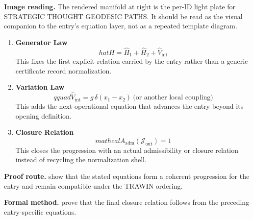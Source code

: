 \begin{samepage}
\noindent\begin{minipage}[t]{0.45\linewidth}
\vspace{0pt}
\raggedright
\scriptsize\textbf{Image reading.} The rendered manifold at right is the per-ID light plate for STRATEGIC THOUGHT GEODESIC PATHS. It should be read as the visual companion to the entry's equation layer, not as a repeated template diagram.\par
\end{minipage}\hfill
\begin{minipage}[t]{0.53\linewidth}
\vspace*{-0.10in}
\raggedright
{}
\end{minipage}
\end{samepage}

\clearpage


\begin{enumerate}[leftmargin=1.6em,itemsep=9pt,topsep=6pt]
\item \textbf{Generator Law}
\[
hat H=\hat H_1+\hat H_2+ \hat V_{\text{int}}
\]
This fixes the first explicit relation carried by the entry rather than a generic certificate record normalization.

\item \textbf{Variation Law}
\[
qquad \hat V_{\text{int}} = g\,\delta(x_1-x_2)\ \text{(or another local coupling)}
\]
This adds the next operational equation that advances the entry beyond its opening definition.

\item \textbf{Closure Relation}
\[
mathcal{A}_{\mathrm{adm}}\!\left(\mathcal{J}_{\mathrm{out}}\right)=1
\]
This closes the progression with an actual admissibility or closure relation instead of recycling the normalization shell.
\end{enumerate}

\textbf{Proof route.} show that the stated equations form a coherent progression for the entry and remain compatible under the TRAWIN ordering.

\textbf{Formal method.} prove that the final closure relation follows from the preceding entry-specific equations.

\medskip
{}

